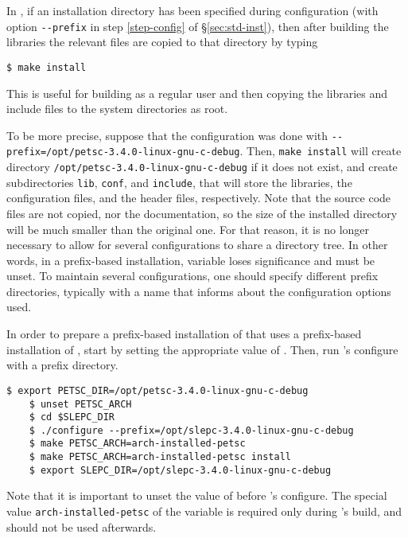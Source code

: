 In \petsc, if an installation directory has been specified during configuration (with option \Verb!--prefix! in step \ref{step-config} of \S\ref{sec:std-inst}), then after building the libraries the relevant files are copied to that directory by typing
	\begin{Verbatim}[fontsize=\small]
	$ make install
	\end{Verbatim}
	This is useful for building as a regular user and then copying the libraries and include files to the system directories as root.

To be more precise, suppose that the configuration was done with \texttt{-{}-prefix=/opt/petsc-3.4.0-linux-gnu-c-debug}. Then, \texttt{make install} will create directory \texttt{/opt/petsc-3.4.0-linux-gnu-c-debug} if it does not exist, and create subdirectories \texttt{lib}, \texttt{conf}, and \texttt{include}, that will store the libraries, the configuration files, and the header files, respectively. Note that the source code files are not copied, nor the documentation, so the size of the installed directory will be much smaller than the original one. For that reason, it is no longer necessary to allow for several configurations to share a directory tree. In other words, in a prefix-based installation, variable  loses significance and must be unset. To maintain several configurations, one should specify different prefix directories, typically with a name that informs about the configuration options used.

In order to prepare a prefix-based installation of \slepc that uses a prefix-based installation of \petsc, start by setting the appropriate value of . Then, run \slepc's configure with a prefix directory.
	\begin{Verbatim}[fontsize=\small,numbers=none]
	$ export PETSC_DIR=/opt/petsc-3.4.0-linux-gnu-c-debug
	$ unset PETSC_ARCH
	$ cd $SLEPC_DIR
	$ ./configure --prefix=/opt/slepc-3.4.0-linux-gnu-c-debug
	$ make PETSC_ARCH=arch-installed-petsc
	$ make PETSC_ARCH=arch-installed-petsc install
	$ export SLEPC_DIR=/opt/slepc-3.4.0-linux-gnu-c-debug
	\end{Verbatim}
Note that it is important to unset the value of  before \slepc's configure. The special value \texttt{arch-installed-petsc} of the  variable is required only during \slepc's build, and should not be used afterwards.


